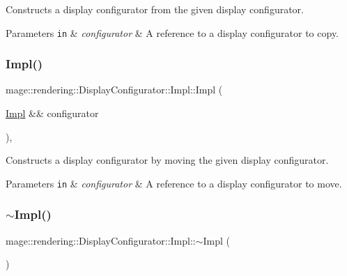 Constructs a display configurator from the given display configurator.


\begin{DoxyParams}[1]{Parameters}
\mbox{\tt in}  & {\em configurator} & A reference to a display configurator to copy. \\
\hline
\end{DoxyParams}
\mbox{\label{classmage_1_1rendering_1_1_display_configurator_1_1_impl_af8ddd060b24cd09deb2beef7737f5277}} 
\subsubsection{\texorpdfstring{Impl()}{Impl()}\hspace{0.1cm}{\footnotesize\ttfamily [4/4]}}
{\footnotesize\ttfamily mage\+::rendering\+::\+Display\+Configurator\+::\+Impl\+::\+Impl (\begin{DoxyParamCaption}\item[{\mbox{\hyperlink{classmage_1_1rendering_1_1_display_configurator_1_1_impl}{Impl}} \&\&}]{configurator }\end{DoxyParamCaption})\hspace{0.3cm}{\ttfamily [default]}, {\ttfamily [noexcept]}}

Constructs a display configurator by moving the given display configurator.


\begin{DoxyParams}[1]{Parameters}
\mbox{\tt in}  & {\em configurator} & A reference to a display configurator to move. \\
\hline
\end{DoxyParams}
\mbox{\label{classmage_1_1rendering_1_1_display_configurator_1_1_impl_a499b92d9d77a4c31cbdefa3a3c22a0be}} 
\subsubsection{\texorpdfstring{$\sim$\+Impl()}{~Impl()}}
{\footnotesize\ttfamily mage\+::rendering\+::\+Display\+Configurator\+::\+Impl\+::$\sim$\+Impl (\begin{DoxyParamCaption}{ }\end{DoxyParamCaption})\hspace{0.3cm}{\ttfamily [default]}}

